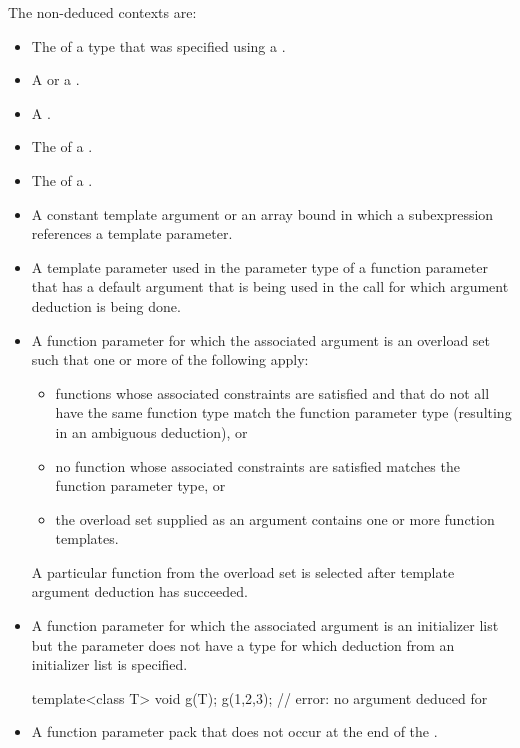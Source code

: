 \pnum
The non-deduced contexts are:

%
\begin{itemize}
\item
The
of a type that was specified using a
.
\item
A  or a .
\item
A .
\item
The  of a .
\item
The  of a .
\item
A constant template argument or an array bound in which a subexpression
references a template parameter.
\item
A template parameter used in the parameter type of a function parameter that
has a default argument that is being used in the call for which argument
deduction is being done.
\item
A function parameter for which the associated argument is an
overload set such that one or more of the following apply:
\begin{itemize}
\item
functions whose associated constraints are satisfied and
that do not all have the same function type
match the function parameter type (resulting in an ambiguous deduction), or
\item
no function whose associated constraints are satisfied
matches the function parameter type, or
\item
the overload set supplied as an argument contains one or more function templates.
\end{itemize}
\begin{tailnote}
A particular function from the overload set is selected
after template argument deduction has succeeded.
\end{tailnote}
\item A function parameter for which the associated argument is an initializer
list but the parameter does not have
a type for which deduction from an initializer list is specified.
\begin{example}
\begin{codeblock}
template<class T> void g(T);
g({1,2,3});                 // error: no argument deduced for 
\end{codeblock}
\end{example}
\item A function parameter pack that does not occur at the end of the
.
\end{itemize}

